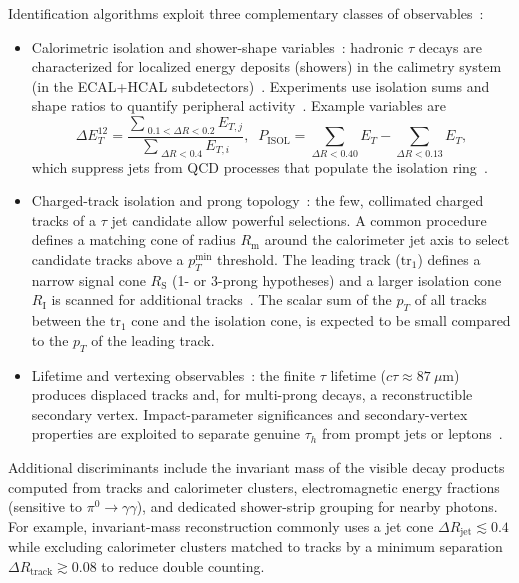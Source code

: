 Identification algorithms exploit three complementary classes of observables~\cite{CMS:2018jrd,ATLAS:2014rzk,CMS_DeepTau,CMS:PF2017}:

\begin{itemize}
  \item Calorimetric isolation and shower-shape variables~\cite{CMS:2018jrd,ATLAS:2014rzk}: hadronic $\tau$ decays are characterized for localized energy deposits (showers) in the calimetry system (in the ECAL+HCAL subdetectors)~\cite{CMS:2018jrd}. Experiments use isolation sums and shape ratios to quantify peripheral activity~\cite{CMS:2018jrd,ATLAS:2014rzk}. Example variables are
  \begin{equation}
    \Delta E_T^{12}=\frac{\sum_{\;0.1<\Delta R<0.2} E_{T,j}}{\sum_{\;\Delta R<0.4} E_{T,i}},\;\;
    P_{\mathrm{ISOL}}=\sum_{\Delta R<0.40}E_T - \sum_{\Delta R<0.13}E_T,
  \end{equation}
  which suppress jets from QCD processes that populate the isolation ring~\cite{CMS:2018jrd}.
  \item Charged-track isolation and prong topology~\cite{CMS:2018jrd,CMS:PF2017}: the few, collimated charged tracks of a $\tau$ jet candidate allow powerful selections. A common procedure defines a matching cone of radius $R_{\mathrm{m}}$ around the calorimeter jet axis to select candidate tracks above a $p_T^{\min}$ threshold. The leading track ($\text{tr}_1$) defines a narrow signal cone $R_{\mathrm{S}}$ (1- or 3-prong hypotheses) and a larger isolation cone $R_{\mathrm{I}}$ is scanned for additional tracks~\cite{CMS:2018jrd,CMS:PF2017}. The scalar sum of the $p_{T}$ of all tracks between the $\text{tr}_1$ cone and the isolation cone, is expected to be small compared to the $p_{T}$ of the leading track.
  
  \item Lifetime and vertexing observables~\cite{CMS:TRK2014,1674-1137-40-10-100001}: the finite $\tau$ lifetime ($c\tau\approx87\ \mu\mathrm{m}$) produces displaced tracks and, for multi-prong decays, a reconstructible secondary vertex. Impact-parameter significances and secondary-vertex properties are exploited to separate genuine $\tau_h$ from prompt jets or leptons~\cite{CMS:TRK2014,1674-1137-40-10-100001}.
\end{itemize}


Additional discriminants include the invariant mass of the visible decay products computed from tracks and calorimeter clusters, electromagnetic energy fractions (sensitive to $\pi^0\to\gamma\gamma$), and dedicated shower-strip grouping for nearby photons. For example, invariant-mass reconstruction commonly uses a jet cone $\Delta R_{\text{jet}}\lesssim0.4$ while excluding calorimeter clusters matched to tracks by a minimum separation $\Delta R_{\text{track}}\gtrsim0.08$ to reduce double counting.

